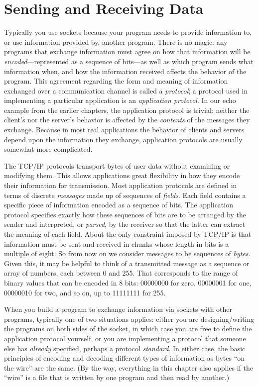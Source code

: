 \chapter{Sending and Receiving Data}
\label{chap:encoding}%

Typically you use sockets because your program needs to provide
information to, or use information provided by, another program. There
is no magic: any programs that exchange information must agree on how
that information will be \emph{encoded}---represented as a sequence of
bits---as well as which program sends what information when, and how
the information received affects the behavior of the program.  This
agreement regarding the form and meaning of information exchanged over
a communication channel is called a \emph{protocol}; a protocol used
in implementing a particular application is an \emph{application
protocol}.  In our echo example from the earlier chapters, the
application protocol is trivial: neither the client's nor the server's
behavior is affected by the \emph{contents\/} of the messages they
exchange.  Because in most real applications the behavior of clients
and servers depend upon the information they exchange, application
protocols are usually somewhat more complicated.

The TCP/IP protocols transport bytes of user data without examining or
modifying them.  This allows applications great flexibility in how
they encode their information for transmission.  Most application
protocols are defined in terms of discrete \emph{messages} made up of
sequences of \emph{fields}.  Each field contains a specific piece of
information encoded as a sequence of bits.  The application protocol
specifies exactly how these sequences of bits are to be arranged by
the sender and interpreted, or \emph{parsed}, by the receiver so that
the latter can extract the meaning of each field.  About the only
constraint imposed by TCP/IP is that information must be sent and
received in chunks whose length in bits is a multiple of eight.  So
from now on we consider messages to be sequences of \emph{bytes}.
Given this, it may be helpful to think of a transmitted message as a
sequence or array of numbers, each between 0 and 255.  That
corresponds to the range of binary values that can be encoded in 8
bits: 00000000 for zero, 00000001 for one, 00000010 for two, and so
on, up to 11111111 for 255.

When you build a program to exchange information via sockets with
other programs, typically one of two situations applies: either you
are designing/writing the programs on both sides of the socket, in
which case you are free to define the application protocol yourself,
or you are implementing a protocol that
someone else has \emph{already\/} specified, perhaps a protocol
\emph{standard}.  In either case, the basic principles of encoding and
decoding different types of information as bytes ``on the wire'' are
the same.  (By the way, everything in this chapter also applies if the
``wire'' is a file that is written by one program and then read by
another.)

